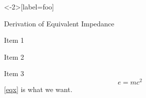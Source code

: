 \documentclass[aspectratio=169, xcolor={x11names}]{beamer}
\begin{document}
\begin{frame}<-2>[label=foo]

    \begin{block}{Derivation of Equivalent Impedance}

        \begin{description}[<+->]
            \item[Item 1] Item 1
            \item[Item 2] Item 2
            \item[Item 3] Item 3
                \begin{equation}e = m c^{2}\label{eqx}\end{equation}\cref{eqx} is what we want.
        \end{description}

    \end{block}\end{frame}


\end{document}
